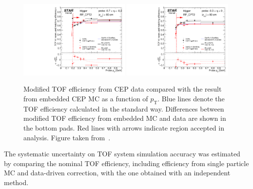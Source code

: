 \begin{figure}[h!]
	\centering
	\includegraphics[width=0.49\textwidth,page=1]{chapters/chrgSTAR/img/tofEff/TofEffVsPt_eta_minus07_to_minus03_CPT2.pdf}
	\includegraphics[width=0.49\textwidth,page=1]{chapters/chrgSTAR/img/tofEff/TofEffVsPt_eta_minus03_to_0_CPT2.pdf}
	\caption{Modified TOF efficiency from \ac{CEP} data compared with the result from embedded \ac{CEP} MC as a function of $p_\textrm{T}$. Blue lines denote the TOF efficiency calculated in the standard way. Differences between modified TOF efficiency from  embedded MC and data are shown in the bottom pads. Red lines with arrows indicate region accepted in analysis. Figure taken from~\cite{RafalThesis}.}
	\label{fig:tofEffiCorrection}
	
\end{figure}

The systematic uncertainty on TOF system simulation accuracy was estimated by comparing the nominal TOF efficiency, including efficiency from single particle MC and data-driven correction, with the one obtained with an independent method. 

